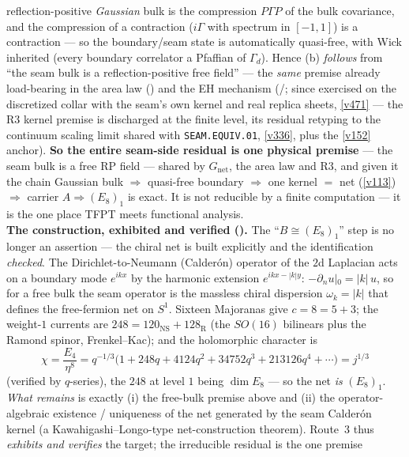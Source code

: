 \begin{keybox}
reflection-positive \emph{Gaussian} bulk is the compression $P\Gamma P$ of the bulk covariance, and the
compression of a contraction ($i\Gamma$ with spectrum in $[-1,1]$) is a contraction --- so the boundary/seam
state is automatically quasi-free, with Wick inherited (every boundary correlator a Pfaffian of $\Gamma_d$).
Hence (b) \emph{follows} from ``the seam bulk is a reflection-positive free field'' --- the \emph{same}
premise already load-bearing in the area law () and the EH mechanism
(/; since exercised on the discretized collar
with the seam's own kernel and real replica sheets, \vref{v471} --- the R3 kernel premise is discharged at
the finite level, its residual retyping to the continuum scaling limit shared with \texttt{SEAM.EQUIV.01},
\vref{v336}, plus the \vref{v152} anchor). \textbf{So the entire seam-side residual is one
physical premise} --- the seam bulk is a free RP field --- shared by $G_{\mathrm{net}}$, the area law and R3,
and given it the chain Gaussian bulk $\Rightarrow$ quasi-free boundary $\Rightarrow$ one kernel $=$ net
(\vref{v113}) $\Rightarrow$ carrier $A\Rightarrow(E_8)_1$ is exact. It is not reducible by a finite computation
--- it is the one place TFPT meets functional analysis.
\smallskip\\
\noindent\textbf{The construction, exhibited and verified ().} The
``$B\cong(E_8)_1$'' step is no longer an assertion --- the chiral net is built explicitly and the
identification \emph{checked}. The Dirichlet-to-Neumann (Calder\'on) operator of the $2$d Laplacian acts
on a boundary mode $e^{ikx}$ by the harmonic extension $e^{ikx-|k|y}$: $-\partial_n u|_0=|k|\,u$, so for a
free bulk the seam operator is the massless chiral dispersion $\omega_k=|k|$ that defines the free-fermion
net on $S^1$. Sixteen Majoranas give $c=8=5{+}3$; the weight-$1$ currents are
$248=120_{\mathrm{NS}}+128_{\mathrm R}$ (the $SO(16)$ bilinears plus the Ramond spinor, Frenkel--Kac); and
the holomorphic character is
\[
  \boxed{\ \chi=\frac{E_4}{\eta^8}=q^{-1/3}\bigl(1+248q+4124q^2+34752q^3+213126q^4+\cdots\bigr)=j^{1/3}\ }
\]
(verified by $q$-series), the $248$ at level $1$ being $\dim E_8$ --- so the net \emph{is} $(E_8)_1$.
\emph{What remains} is exactly (i) the free-bulk premise above and (ii) the operator-algebraic existence /
uniqueness of the net generated by the seam Calder\'on kernel (a Kawahigashi--Longo-type net-construction
theorem). Route~3 thus \emph{exhibits and verifies} the target; the irreducible residual is the one premise

\end{keybox}
